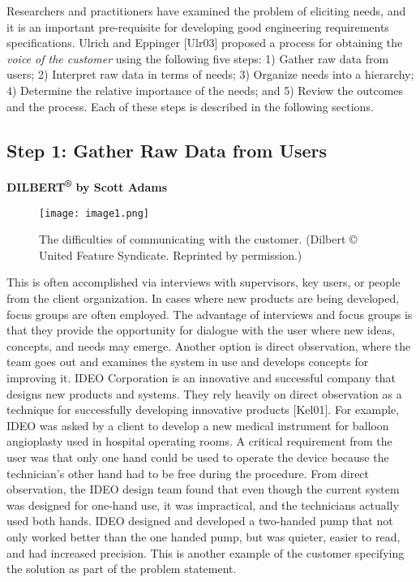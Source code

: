 Researchers and practitioners have examined the problem of eliciting
needs, and it is an important pre-requisite for developing good
engineering requirements specifications. Ulrich and Eppinger {[}Ulr03{]}
proposed a process for obtaining the \emph{voice of the customer} using
the following five steps: 1) Gather raw data from users; 2) Interpret
raw data in terms of needs; 3) Organize needs into a hierarchy; 4)
Determine the relative importance of the needs; and 5) Review the
outcomes and the process. Each of these steps is described in the
following sections.

\subsection*{ Step 1: Gather Raw Data from Users}

\textbf{DILBERT\textsuperscript{®} by Scott Adams}

\begin{figure}[h]
\texttt{[image: image1.png]}
\caption{ The difficulties of communicating with the customer. (Dilbert © United Feature Syndicate. Reprinted by
permission.)}
\label{figure:dilbertCommunication}
\end{figure}


This is often accomplished via interviews with supervisors, key users,
or people from the client organization. In cases where new products are
being developed, focus groups are often employed. The advantage of
interviews and focus groups is that they provide the opportunity for
dialogue with the user where new ideas, concepts, and needs may emerge.
Another option is direct observation, where the team goes out and
examines the system in use and develops concepts for improving it. IDEO
Corporation is an innovative and successful company that designs new
products and systems. They rely heavily on direct observation as a
technique for successfully developing innovative products {[}Kel01{]}.
For example, IDEO was asked by a client to develop a new medical
instrument for balloon angioplasty used in hospital operating rooms. A
critical requirement from the user was that only one hand could be used
to operate the device because the technician's other hand had to be free
during the procedure. From direct observation, the IDEO design team
found that even though the current system was designed for one-hand use,
it was impractical, and the technicians actually used both hands. IDEO
designed and developed a two-handed pump that not only worked better
than the one handed pump, but was quieter, easier to read, and had
increased precision. This is another example of the customer specifying
the solution as part of the problem statement.

